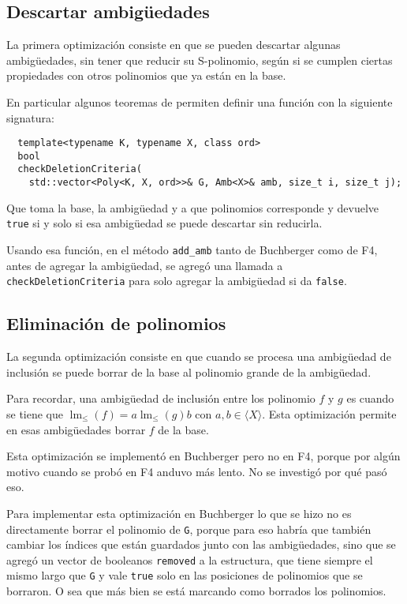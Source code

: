 \documentclass[12pt]{report}
\theoremstyle{customstyle}
\theoremstyle{factstyle}
\DeclareMathOperator{\lm}{lm}
\begin{document}
\subsection{Descartar ambigüedades}

La primera optimización consiste en que se pueden descartar algunas ambigüedades, sin tener que reducir su S-polinomio, según si se cumplen ciertas propiedades con otros polinomios que ya están en la base.

En particular algunos teoremas de \cite{thesis:Hof20} permiten definir una función con la siguiente signatura:

\begin{verbatim}
  template<typename K, typename X, class ord>
  bool
  checkDeletionCriteria(
    std::vector<Poly<K, X, ord>>& G, Amb<X>& amb, size_t i, size_t j);
\end{verbatim}

Que toma la base, la ambigüedad y a que polinomios corresponde y devuelve \texttt{true} si y solo si esa ambigüedad se puede descartar sin reducirla.

Usando esa función, en el método \texttt{add\_amb} tanto de Buchberger como de F4, antes de agregar la ambigüedad, se agregó una llamada a \texttt{checkDeletionCriteria} para solo agregar la ambigüedad si da \texttt{false}.

\subsection{Eliminación de polinomios}

La segunda optimización consiste en que cuando se procesa una ambigüedad de inclusión se puede borrar de la base al polinomio grande de la ambigüedad.

Para recordar, una ambigüedad de inclusión entre los polinomio $f$ y $g$ es cuando se tiene que $\lm_≤(f) = a \lm_≤(g) b$ con $a, b ∈ ⟨X⟩$. Esta optimización permite en esas ambigüedades borrar $f$ de la base.

Esta optimización se implementó en Buchberger pero no en F4, porque por algún motivo cuando se probó en F4 anduvo más lento. No se investigó por qué pasó eso.

Para implementar esta optimización en Buchberger lo que se hizo no es directamente borrar el polinomio de \texttt{G}, porque para eso habría que también cambiar los índices que están guardados junto con las ambigüedades, sino que se agregó un vector de booleanos \texttt{removed} a la estructura, que tiene siempre el mismo largo que \texttt{G} y vale \texttt{true} solo en las posiciones de polinomios que se borraron. O sea que más bien se está marcando como borrados los polinomios.
\end{document}
